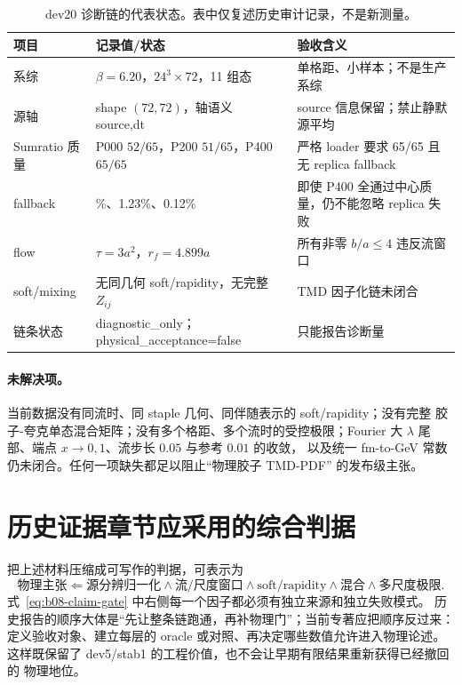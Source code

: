 \begin{table}[htbp]
\centering
\caption{dev20 诊断链的代表状态。表中仅复述历史审计记录，不是新测量。}
\label{tab:b08-dev20-status}
\small
\begin{tabularx}{\textwidth}{>{\raggedright\arraybackslash}p{3.1cm}>{\raggedright\arraybackslash}p{4.1cm}>{\raggedright\arraybackslash}X}
\toprule
项目 & 记录值/状态 & 验收含义 \\
\midrule
系综 & \(\beta=6.20\)，\(24^3\times72\)，11 组态 & 单格距、小样本；不是生产系综 \\
源轴 & shape \((72,72)\)，轴语义 source,dt & source 信息保留；禁止静默源平均 \\
Sumratio 质量 & P000 \(52/65\)，P200 \(51/65\)，P400 \(65/65\) & 严格 loader 要求 65/65 且无 replica fallback \\
fallback & 1.46\%、1.23\%、0.12\% & 即使 P400 全通过中心质量，仍不能忽略 replica 失败 \\
flow & \(\tau=3a^2\)，\(r_f=4.899a\) & 所有非零 \(b/a\le4\) 违反流窗口 \\
soft/mixing & 无同几何 soft/rapidity，无完整 \(Z_{ij}\) & TMD 因子化链未闭合 \\
链条状态 & diagnostic\_only；physical\_acceptance=false & 只能报告诊断量 \\
\bottomrule
\end{tabularx}
\end{table}

\paragraph{未解决项。}
当前数据没有同流时、同 staple 几何、同伴随表示的 soft/rapidity；没有完整
胶子-夸克单态混合矩阵；没有多个格距、多个流时的受控极限；Fourier 大
\(\lambda\) 尾部、端点 \(x\to0,1\)、流步长 \(0.05\) 与参考 \(0.01\) 的收敛，
以及统一 fm-to-GeV 常数仍未闭合。任何一项缺失都足以阻止“物理胶子 TMD-PDF”
的发布级主张。

\section{历史证据章节应采用的综合判据}

把上述材料压缩成可写作的判据，可表示为
\begin{equation}
  \text{物理主张}
  \Longleftarrow
  \text{源分辨归一化}
  \wedge\text{流/尺度窗口}
  \wedge\text{soft/rapidity}
  \wedge\text{混合}
  \wedge\text{多尺度极限}.
  \label{eq:b08-claim-gate}
\end{equation}
式~\eqref{eq:b08-claim-gate} 中右侧每一个因子都必须有独立来源和独立失败模式。
历史报告的顺序大体是“先让整条链跑通，再补物理门”；当前专著应把顺序反过来：
定义验收对象、建立每层的 oracle 或对照、再决定哪些数值允许进入物理论述。
这样既保留了 dev5/stab1 的工程价值，也不会让早期有限结果重新获得已经撤回的
物理地位。
